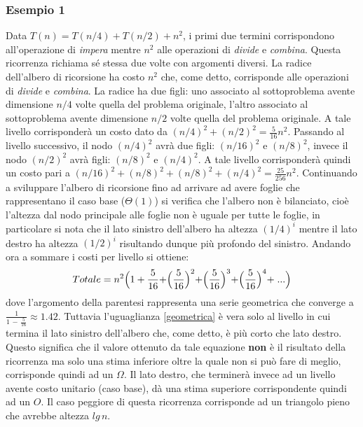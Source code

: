 \documentclass[10pt, a4paper]{report}
\begin{document}
\subsubsection{Esempio 1}
Data $T(n) = T(n/4) + T(n/2) + n^2$, i primi due termini corrispondono all'operazione di \textsl{impera} mentre $n^2$ alle operazioni di \textsl{divide} e \textsl{combina}. Questa ricorrenza richiama sé stessa due volte con argomenti diversi. La radice dell'albero di ricorsione ha costo $n^2$ che, come detto, corrisponde alle operazioni di \textsl{divide} e \textsl{combina}. La radice ha due figli: uno associato al sottoproblema avente dimensione $n/4$ volte quella del problema originale, l'altro associato al sottoproblema avente dimensione $n/2$ volte quella del problema originale. A tale livello corrisponderà un costo dato da $(n/4)^2 + (n/2)^2 = \frac{5}{16}n^2$. Passando al livello successivo, il nodo $(n/4)^2$ avrà due figli: $(n/16)^2$ e $(n/8)^2$, invece il nodo $(n/2)^2$ avrà figli: $(n/8)^2$ e $(n/4)^2$. A tale livello corrisponderà quindi un costo pari a $(n/16)^2 + (n/8)^2 + (n/8)^2 + (n/4)^2 = \frac{25}{256}n^2$. Continuando a sviluppare l'albero di ricorsione fino ad arrivare ad avere foglie che rappresentano il caso base ($\Theta(1)$) si verifica che l'albero non è bilanciato, cioè l'altezza dal nodo principale alle foglie non è uguale per tutte le foglie, in particolare si nota che il lato sinistro dell'albero ha altezza $(1/4)^i$ mentre il lato destro ha altezza $(1/2)^i$ risultando dunque più profondo del sinistro. Andando ora a sommare i costi per livello si ottiene:
\begin{equation}
Totale = n^2\Bigr(1 + \frac{5}{16} + \Bigr(\frac{5}{16}\Bigl)^2 + \Bigr(\frac{5}{16}\Bigl)^3 + \Bigr(\frac{5}{16}\Bigl)^4 + \;... \Bigl)
\label{geometrica}
\end{equation}
dove l'argomento della parentesi rappresenta una serie geometrica  che converge a  $\frac{1}{1 \,-\, \frac{5}{16}} \approx 1.42$. Tuttavia l'uguaglianza \eqref{geometrica} è vera solo al livello in cui termina il lato sinistro dell'albero che, come detto, è più corto che lato destro. Questo significa che il valore ottenuto da tale equazione \textbf{non} è il risultato della ricorrenza ma solo una stima inferiore oltre la quale non si può fare di meglio, corrisponde quindi ad un $\Omega$. Il lato destro, che terminerà invece ad un livello avente costo unitario (caso base), dà una stima superiore corrispondente quindi ad un $O$. Il caso peggiore di questa ricorrenza corrisponde ad un triangolo pieno che avrebbe altezza $lg\,n$.
\end{document}

